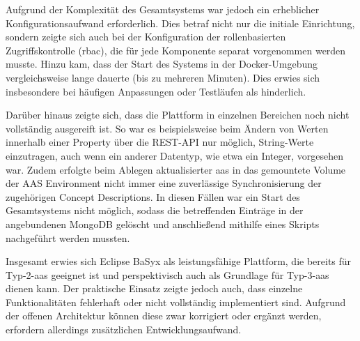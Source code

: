 Aufgrund der Komplexität des Gesamtsystems war jedoch ein erheblicher Konfigurationsaufwand erforderlich.
Dies betraf nicht nur die initiale Einrichtung, sondern zeigte sich auch bei der Konfiguration der rollenbasierten Zugriffskontrolle (\acs{rbac}), die für jede Komponente separat vorgenommen werden musste.
Hinzu kam, dass der Start des Systems in der Docker-Umgebung vergleichsweise lange dauerte (bis zu mehreren Minuten).
Dies erwies sich insbesondere bei häufigen Anpassungen oder Testläufen als hinderlich.

Darüber hinaus zeigte sich, dass die Plattform in einzelnen Bereichen noch nicht vollständig ausgereift ist.
So war es beispielsweise beim Ändern von Werten innerhalb einer Property über die REST-API nur möglich, String-Werte einzutragen, auch wenn ein anderer Datentyp, wie etwa ein Integer, vorgesehen war.
Zudem erfolgte beim Ablegen aktualisierter \acs{aas} in das gemountete Volume der AAS Environment nicht immer eine zuverlässige Synchronisierung der zugehörigen Concept Descriptions.
In diesen Fällen war ein Start des Gesamtsystems nicht möglich, sodass die betreffenden Einträge in der angebundenen MongoDB gelöscht und anschließend mithilfe eines Skripts nachgeführt werden mussten.

Insgesamt erwies sich Eclipse BaSyx als leistungsfähige Plattform, die bereits für Typ-2-\acs{aas} geeignet ist und perspektivisch auch als Grundlage für Typ-3-\acs{aas} dienen kann.
Der praktische Einsatz zeigte jedoch auch, dass einzelne Funktionalitäten fehlerhaft oder nicht vollständig implementiert sind.
Aufgrund der offenen Architektur können diese zwar korrigiert oder ergänzt werden, erfordern allerdings zusätzlichen Entwicklungsaufwand.









